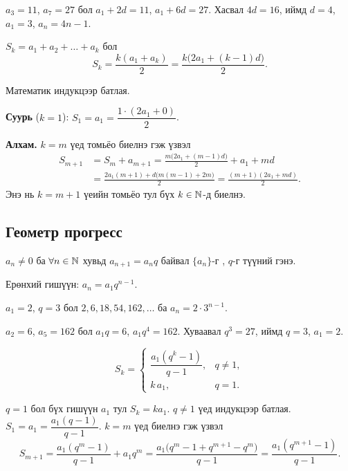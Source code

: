 \begin{example}
$a_3=11$, $a_7=27$ бол $a_1+2d=11$, $a_1+6d=27$. Хасвал $4d=16$, иймд $d=4$, $a_1=3$,
$a_n=4n-1$.
\end{example}

\begin{theorem}
$S_k=a_1+a_2+\dots+a_k$ бол
\[
S_k=\frac{k(a_1+a_k)}{2}=\frac{k\bigl(2a_1+(k-1)d\bigr)}{2}.
\]
\end{theorem}
\begin{prof}
Математик индукцээр батлая.

\textbf{Суурь} ($k=1$): $S_1=a_1=\dfrac{1\cdot(2a_1+0)}{2}$.

\textbf{Алхам.} $k=m$ үед томьёо биелнэ гэж үзвэл
\begin{align*}
S_{m+1}&=S_m+a_{m+1}=\frac{m\bigl(2a_1+(m-1)d\bigr)}{2}+a_1+md\\
&=\frac{2a_1(m+1)+d\bigl(m(m-1)+2m\bigr)}{2}=\frac{(m+1)(2a_1+md)}{2}.
\end{align*}
Энэ нь $k=m+1$ үеийн томьёо тул бүх $k\in\mathbb{N}$-д биелнэ.
\end{prof}

\subsection{Геометр прогресс}
\begin{definition}
$a_n\neq0$ ба $\forall n\in\mathbb{N}$ хувьд $a_{n+1}=a_nq$ байвал $\{a_n\}$-г
, $q$-г түүний  гэнэ.
\end{definition}

Ерөнхий гишүүн: $a_n=a_1q^{n-1}$.

\begin{example}
$a_1=2$, $q=3$ бол $2,6,18,54,162,\ldots$ ба $a_n=2\cdot3^{n-1}$.
\end{example}

\begin{example}
$a_2=6$, $a_5=162$ бол $a_1q=6$, $a_1q^4=162$. Хуваавал $q^3=27$, иймд $q=3$, $a_1=2$.
\end{example}

\begin{theorem}
\[
S_k=
\begin{cases}
\dfrac{a_1(q^k-1)}{q-1}, & q\neq1,\\[6pt]
k\,a_1, & q=1.
\end{cases}
\]
\end{theorem}
\begin{prof}
$q=1$ бол бүх гишүүн $a_1$ тул $S_k=ka_1$. $q\neq1$ үед индукцээр батлая.
$S_1=a_1=\dfrac{a_1(q-1)}{q-1}$. $k=m$ үед биелнэ гэж үзвэл
\[
S_{m+1}=\frac{a_1(q^m-1)}{q-1}+a_1q^m=\frac{a_1\bigl(q^m-1+q^{m+1}-q^m\bigr)}{q-1}
=\frac{a_1(q^{m+1}-1)}{q-1}.
\]
\end{prof}

